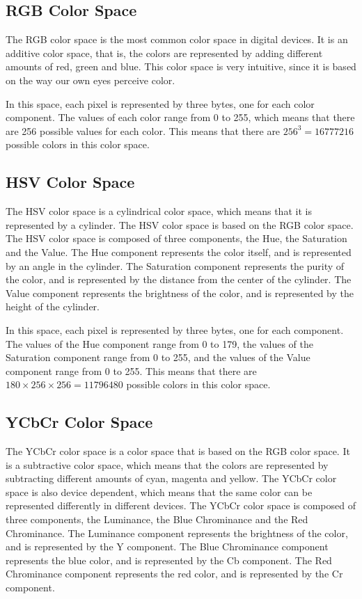 \documentclass[journal]{IEEEtran}
\begin{document}
\subsection{RGB Color Space}

The RGB color space is the most common color space in digital devices. It is an additive color space, that is, the colors are represented by adding different amounts of red, green and blue. This color space is very intuitive, since it is based on the way our own eyes perceive color.

In this space, each pixel is represented by three bytes, one for each color component. The values of each color range from 0 to 255, which means that there are 256 possible values for each color. This means that there are $256^3 = 16777216$ possible colors in this color space.

\subsection{HSV Color Space}

The HSV color space is a cylindrical color space, which means that it is represented by a cylinder. The HSV color space is based on the RGB color space. The HSV color space is composed of three components, the Hue, the Saturation and the Value. The Hue component represents the color itself, and is represented by an angle in the cylinder. The Saturation component represents the purity of the color, and is represented by the distance from the center of the cylinder. The Value component represents the brightness of the color, and is represented by the height of the cylinder.

In this space, each pixel is represented by three bytes, one for each component. The values of the Hue component range from 0 to 179, the values of the Saturation component range from 0 to 255, and the values of the Value component range from 0 to 255. This means that there are $180 \times 256 \times 256 = 11796480$ possible colors in this color space.

\subsection{YCbCr Color Space}

The YCbCr color space is a color space that is based on the RGB color space. It is a subtractive color space, which means that the colors are represented by subtracting different amounts of cyan, magenta and yellow. The YCbCr color space is also device dependent, which means that the same color can be represented differently in different devices. The YCbCr color space is composed of three components, the Luminance, the Blue Chrominance and the Red Chrominance. The Luminance component represents the brightness of the color, and is represented by the Y component. The Blue Chrominance component represents the blue color, and is represented by the Cb component. The Red Chrominance component represents the red color, and is represented by the Cr component.
\end{document}
